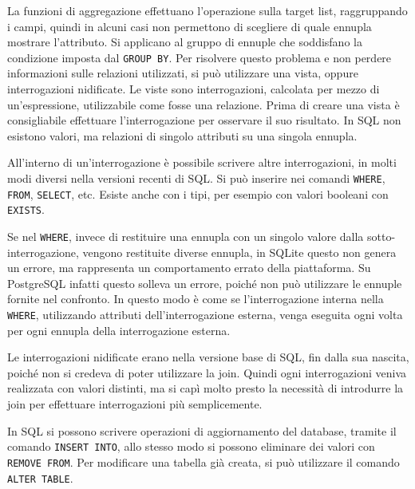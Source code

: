 \documentclass{article}
\numberwithin{equation}{subsection}
\begin{document}
La funzioni di aggregazione effettuano l'operazione sulla target list, raggruppando i campi, quindi in alcuni casi non permettono di scegliere di quale ennupla mostrare 
l'attributo. Si applicano al gruppo di ennuple che soddisfano la condizione imposta dal \verb|GROUP BY|. 
Per risolvere questo problema e non perdere informazioni sulle relazioni utilizzati, si può utilizzare una vista, oppure interrogazioni nidificate. Le viste sono 
interrogazioni, calcolata per mezzo di un'espressione, utilizzabile come fosse una relazione. Prima di creare una vista è consigliabile 
effettuare l'interrogazione per osservare il suo risultato. 
In SQL non esistono valori, ma relazioni di singolo attributi su una singola ennupla. 

All'interno di un'interrogazione è possibile scrivere altre interrogazioni, in molti modi diversi nella versioni recenti di SQL. Si può inserire nei comandi \verb|WHERE|, 
\verb|FROM|, \verb|SELECT|, etc. Esiste anche con i tipi, per esempio con valori booleani con \verb|EXISTS|. 

Se nel \verb|WHERE|, invece di restituire una ennupla con un singolo valore dalla sotto-interrogazione, vengono restituite diverse ennupla, in SQLite questo non genera 
un errore, ma rappresenta un comportamento errato della piattaforma. Su PostgreSQL infatti questo solleva un errore, poiché non può utilizzare le ennuple fornite nel 
confronto. In questo modo è come se l'interrogazione interna nella \verb|WHERE|, utilizzando attributi dell'interrogazione esterna, venga eseguita ogni volta per ogni 
ennupla della interrogazione esterna. 

Le interrogazioni nidificate erano nella versione base di SQL, fin dalla sua nascita, poiché non si credeva di poter utilizzare la join. Quindi ogni interrogazioni 
veniva realizzata con valori distinti, ma si capì molto presto la necessità di introdurre la join per effettuare interrogazioni più semplicemente. 


In SQL si possono scrivere operazioni di aggiornamento del database, tramite il comando \verb|INSERT INTO|, allo stesso modo si possono eliminare dei valori con 
\verb|REMOVE FROM|. Per modificare una tabella già creata, si può utilizzare il comando \verb|ALTER TABLE|. 
\end{document}
